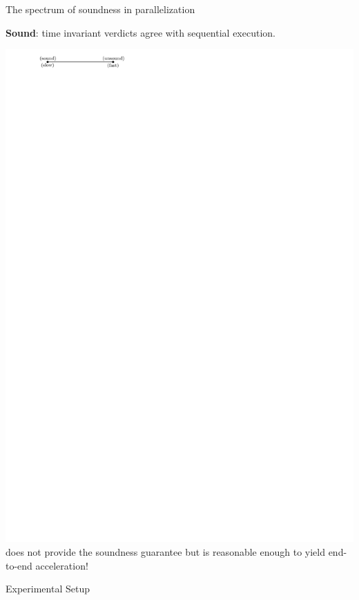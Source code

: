 \documentclass{beamer}
\begin{document}
\begin{frame}{The spectrum of soundness in parallelization}
	
	{\textbf{\rsm Sound}: time invariant verdicts agree with sequential execution.}
	\begin{center}
		\includegraphics[width=0.8\linewidth,page=2]{images/spectrum.pdf}
		\vfill
		{\color{blue}\tname{} does not provide the soundness guarantee but is reasonable enough to yield end-to-end acceleration!}
	\end{center}
\end{frame}

\begingroup
\renewcommand{\disp}{}
\begin{frame}
	\begin{center}
		Experimental Setup
	\end{center}
\end{frame}
\endgroup
\addtocounter{framenumber}{-1}
\end{document}
